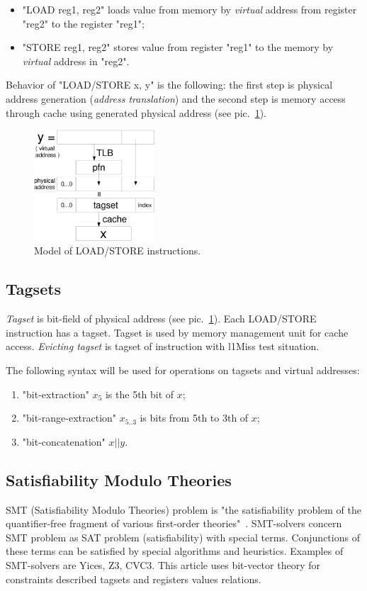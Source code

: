 \documentclass[times, 10pt,twocolumn]{article}
\begin{document}
\begin{itemize}
\item "LOAD reg1, reg2" loads value from memory by \emph{virtual} address from register "reg2" to the register "reg1";
\item "STORE reg1, reg2" stores value from register "reg1" to the
memory by \emph{virtual} address in "reg2".
\end{itemize}

Behavior of "LOAD/STORE x, y" is the following: the first step is
physical address generation (\emph{address translation}) and the
second step is memory access through cache using generated physical address (see pic.~\ref{LOAD}).

\begin{figure}[h]\label{LOAD}
\includegraphics[width=0.4\textwidth]{load}
\caption{Model of LOAD/STORE instructions.}
\end{figure} %

\subsection{Tagsets}

\emph{Tagset} is bit-field of physical address (see pic.~\ref{LOAD}). Each LOAD/STORE instruction has a tagset. Tagset is used by memory management unit for cache access.
\emph{Evicting tagset} is tagset of instruction with l1Miss test situation.

The following syntax will be used for operations on tagsets and virtual addresses:
\begin{enumerate}
\item "bit-extraction" $x_5$ is the 5th bit of $x$;
\item "bit-range-extraction" $x_{5..3}$ is bits from 5th to 3th of $x$;
\item "bit-concatenation" $x||y$.
\end{enumerate}

\subsection{Satisfiability Modulo Theories}
SMT (Satisfiability Modulo Theories) problem is "the satisfiability problem of the quantifier-free fragment of various first-order theories"~\cite{SMT}. SMT-solvers concern SMT problem as SAT problem (satisfiability) with special terms. Conjunctions of these terms can be satisfied by special algorithms and heuristics. Examples of SMT-solvers are Yices, Z3, CVC3. This article uses bit-vector theory for constraints described tagsets and registers values relations.
\end{document}
